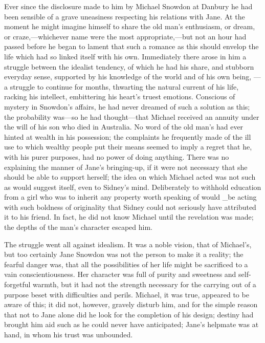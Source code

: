 Ever since the disclosure made to him by Michael Snowdon at Danbury he
had been sensible of a grave uneasiness respecting his relations with
Jane. At the moment he might imagine himself to share the old man's
{}enthusiasm, or dream, or craze,---whichever name were the most
appropriate,---but not an hour had passed before he began to lament that
such a romance as this should envelop the life which had so linked
itself with his own. Immediately there arose in him a struggle between
the idealist tendency, of which he had his share, and stubborn everyday
sense, supported by his knowledge of the world and of his own being, ---
a struggle to continue for months, thwarting the natural current of his
life, racking his intellect, embittering his heart's truest emotions.
Conscious of mystery in Snowdon's affairs, he had never dreamed of such
a solution as this; the probability was---so he had thought---that
Michael received an annuity under the will of his son who died in
Australia. No word of the old man's had ever hinted at wealth in his
possession; the complaints he frequently made of the ill use to which
wealthy people put their means seemed to imply a regret that he, with
his purer purposes, had no power of doing anything. There was no
explaining the manner of Jane's {}bringing-up, if it were not necessary
that she should be able to support herself; the idea on which Michael
acted was not such as would suggest itself, even to Sidney's mind.
Deliberately to withhold education from a girl who was to inherit any
property worth speaking of would \_be acting with such boldness of
originality that Sidney could not seriously have attributed it to his
friend. In fact, he did not know Michael until the revelation was made;
the depths of the man's character escaped him.

The struggle went all against idealism. It was a noble vision, that of
Michael's, but too certainly Jane Snowdon was not the person to make it
a reality; the fearful danger was, that all the possibilities of her
life might be sacrificed to a vain conscientiousness. Her character was
full of purity and sweetness and self-forgetful warmth, but it had not
the strength necessary for the carrying out of a purpose beset with
difficulties and perils. Michael, it was true, appeared to be aware of
this; it did not, however, gravely disturb {}him, and for the simple
reason that not to Jane alone did he look for the completion of his
design; destiny had brought him aid such as he could never have
anticipated; Jane's helpmate was at hand, in whom his trust was
unbounded.

